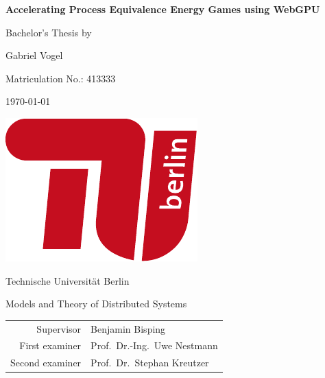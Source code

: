 \documentclass[a4paper]{report}
\theoremstyle{definition}
\begin{document}
\begin{titlepage}
    \centering

    \vspace*{4em}

    \LARGE
    \textbf{Accelerating Process Equivalence Energy Games using WebGPU}
    \vspace{2em}

    \large
    Bachelor's Thesis by

    Gabriel Vogel

    Matriculation No.: 413333
    \vspace{1em}

    \today
    \vspace{3em}

    \includegraphics{images/TU_Logo_kurz_RGB_rot.pdf}
    \vspace{3em}

    Technische Universität Berlin
    \vspace{5pt}

    Models and Theory of Distributed Systems
    \vfill

    \begin{tabular}{r@{: }l}
        Supervisor      &Benjamin Bisping \\
        First examiner  &Prof.~Dr.-Ing.~Uwe Nestmann \\
        Second examiner &Prof.~Dr.~Stephan Kreutzer \\
    \end{tabular}
    \vspace*{4em}
\end{titlepage}
\end{document}
